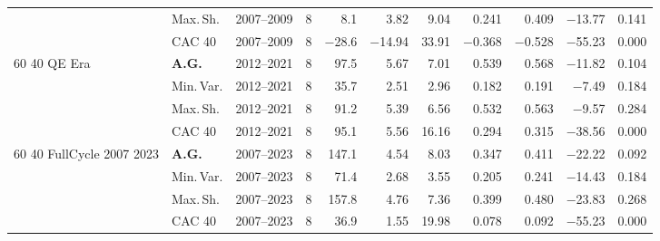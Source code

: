 \begin{longtable}{p{2.6cm} l c c r r r r r r r}
 & Max.\,Sh. & 2007--2009 & 8 & 8.1 & 3.82 & 9.04 & 0.241 & 0.409 & $-$13.77 & 0.141 \\
 & CAC 40 & 2007--2009 & 8 & $-$28.6 & $-$14.94 & 33.91 & $-$0.368 & $-$0.528 & $-$55.23 & 0.000 \\
\midrule
60 40 QE Era & \textbf{A.G.} & 2012--2021 & 8 & 97.5 & 5.67 & 7.01 & 0.539 & 0.568 & $-$11.82 & 0.104 \\
 & Min.\,Var. & 2012--2021 & 8 & 35.7 & 2.51 & 2.96 & 0.182 & 0.191 & $-$7.49 & 0.184 \\
 & Max.\,Sh. & 2012--2021 & 8 & 91.2 & 5.39 & 6.56 & 0.532 & 0.563 & $-$9.57 & 0.284 \\
 & CAC 40 & 2012--2021 & 8 & 95.1 & 5.56 & 16.16 & 0.294 & 0.315 & $-$38.56 & 0.000 \\
\midrule
60 40 FullCycle 2007 2023 & \textbf{A.G.} & 2007--2023 & 8 & 147.1 & 4.54 & 8.03 & 0.347 & 0.411 & $-$22.22 & 0.092 \\
 & Min.\,Var. & 2007--2023 & 8 & 71.4 & 2.68 & 3.55 & 0.205 & 0.241 & $-$14.43 & 0.184 \\
 & Max.\,Sh. & 2007--2023 & 8 & 157.8 & 4.76 & 7.36 & 0.399 & 0.480 & $-$23.83 & 0.268 \\
 & CAC 40 & 2007--2023 & 8 & 36.9 & 1.55 & 19.98 & 0.078 & 0.092 & $-$55.23 & 0.000 \\
\end{longtable}
\endgroup
